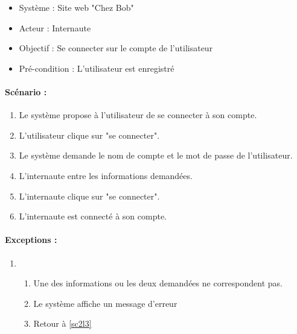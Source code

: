 \begin{boxedminipage}[t]{12cm}
	\begin{itemize}
		\item Système : Site web "Chez Bob"
		\item Acteur : Internaute
		\item Objectif : Se connecter sur le compte de l'utilisateur
		\item Pré-condition : L'utilisateur est enregistré
	\end{itemize}

	\renewcommand\theenumi{\arabic{enumi}}
	\renewcommand\labelenumi{\theenumi .}
	\renewcommand\theenumii{\Alph{enumii}}
	\renewcommand\labelenumii{(\theenumii)}
	\paragraph{Scénario : }
	\begin{enumerate}
		\item \label{sc2l1} Le système propose à l'utilisateur de se connecter à son compte.
		\item \label{sc2l2} L'utilisateur clique sur "se connecter".
		\item \label{sc2l3} Le système demande le nom de compte et le mot de passe de l'utilisateur.
		\item \label{sc2l4} L'internaute entre les informations demandées.
		\item \label{sc2l5} L'internaute clique sur "se connecter".
		\item \label{sc2l6} L'internaute est connecté à son compte.
	\end{enumerate}

	\renewcommand\theenumi{\Alph{enumi}}
	\renewcommand\labelenumi{\theenumi )}
	\renewcommand\theenumii{\arabic{enumii}}
	\renewcommand\labelenumii{\theenumii .}
	\paragraph{Exceptions :} 
	\begin{enumerate}
		\item
		\begin{enumerate}
			\addtocounter{enumii}{4}
			\item Une des informations ou les deux demandées ne correspondent pas.
			\item Le système affiche un message d'erreur
			\item Retour à \ref{sc2l3}
		\end{enumerate}
	\end{enumerate}
\end{boxedminipage}
\newline

